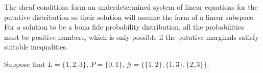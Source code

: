 The sheaf conditions form an underdetermined system of linear equations for the putative distribution so their solution will assume the form of a linear subspace.  For a solution to be a bona fide probability distribution, all the probabilities must be positive numbers, which is only possible if the putative marginals satisfy suitable inequalities.

Suppose that $L = \{1,2,3\}$, $P = \{0,1\}$, $\mathcal{G} = \{\{1,2\},\{1,3\},\{2,3\}\}$.



